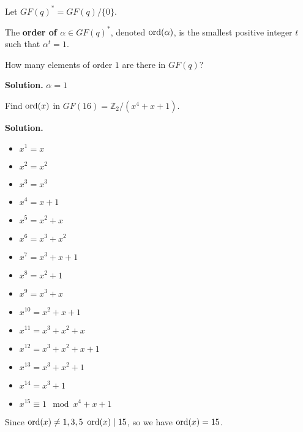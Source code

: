 \begin{defbox}
    \begin{definition}
        Let $ GF(q)^*=GF(q)/\{0\} $.
    \end{definition}
\end{defbox}

\begin{defbox}
    \begin{definition}
        The \textbf{order of $\alpha\in GF(q)^*$}, denoted
        $ \operatorname{ord}(\alpha) $, is the smallest positive integer $ t $ such that
        $ \alpha^t=1 $.
    \end{definition}
\end{defbox}

\begin{exbox}
    \begin{example}
        How many elements of order $ 1 $ are there in $ GF(q) $?

        \textbf{Solution.} $ \alpha=1 $
    \end{example}
\end{exbox}

\begin{exbox}
    \begin{example}
        Find $ \operatorname{ord}(x) $ in $ GF(16)=\mathbb{Z}_2/(x^4+x+1) $.

        \textbf{Solution.}
        \begin{itemize}
            \item $ x^1=x $
            \item $ x^2=x^2 $
            \item $ x^3=x^3 $
            \item $ x^4=x+1 $
            \item $ x^5=x^2+x $
            \item $ x^6=x^3+x^2 $
            \item $ x^7=x^3+x+1 $
            \item $ x^8=x^2+1 $
            \item $ x^9=x^3+x $
            \item $ x^{10}=x^2+x+1 $
            \item $ x^{11}=x^3+x^2+x $
            \item $ x^{12}=x^3+x^2+x+1 $
            \item $ x^{13}=x^3+x^2+1 $
            \item $ x^{14}=x^3+1 $
            \item $ x^15\equiv 1\mod x^4+x+1 $
        \end{itemize}
        Since $ \operatorname{ord}(x)\neq 1,3,5 $ $ \operatorname{ord}(x)\mid 15 $, so we have $ \operatorname{ord}(x)=15 $.
    \end{example}
\end{exbox}

